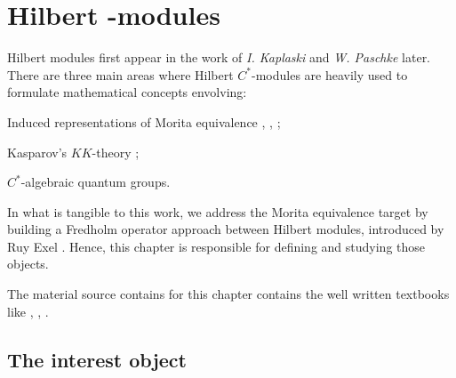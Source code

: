 \chapter[Hilbert \texorpdfstring{\ensuremath{C^*}}{C*}-modules]{Hilbert \texorpdfstring{}{C*}-modules}
\label{ch:hilbert modules}

Hilbert modules first appear in the work of \textit{I. Kaplaski} \cite{kaplansky1953modules} and \textit{W. Paschke} \cite{paschke1973inner} later. There are three main areas where Hilbert $C^*$-modules are heavily used to formulate mathematical concepts envolving:
\begin{itroman}
    \item\label{main areas (i)} Induced representations of Morita equivalence \cite{brown1977stable}, \cite{RIEFFEL1974176}, \cite{rieffel1981c};
    \item Kasparov's $KK$-theory \cite{kasparov1980stinespring};
    \item $C^*$-algebraic quantum groups.
\end{itroman}

In what is tangible to this work, we address the Morita equivalence target by building a Fredholm operator approach between Hilbert modules, introduced by Ruy Exel \cite{exel7fredholm}. Hence, this chapter is responsible for defining and studying those objects.

The material source contains for this chapter contains the well written textbooks like \cite{lance1995hilbert}, \cite{jensen2012elements}, \cite{manuilov2001hilbert}.

\section{The interest object}



